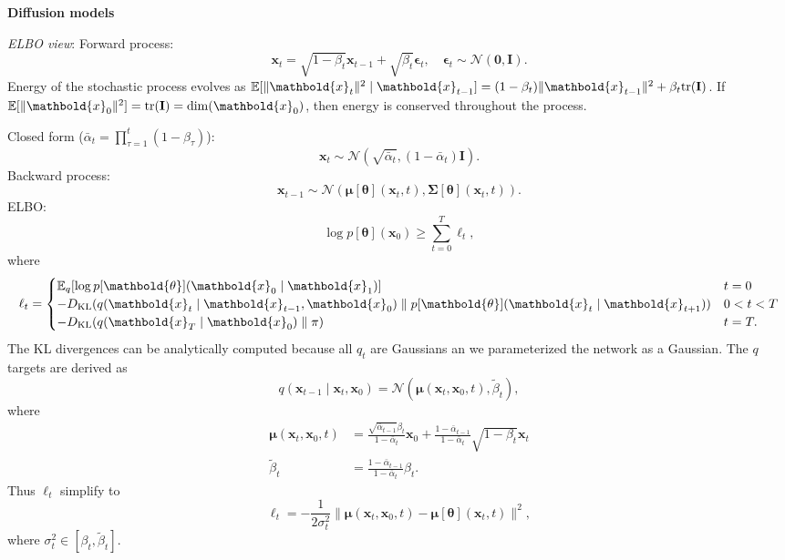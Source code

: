 \documentclass[10pt]{article}
\newenvironment{topic}[1]
{\textbf{\sffamily \footnotesize \colorbox{black}{\rlap{\textbf{\textcolor{white}{#1}}}\hspace{\linewidth}\hspace{-2\fboxsep}}}}
{}
\newenvironment{subtopic}[1]
{\vspace{0.1cm} \begin{center}\textbf{\footnotesize \sffamily #1}\end{center}}
{}
\renewcommand{\mat}[1]{\ensuremath{\mathbf{#1}}}
\renewcommand{\vec}[1]{\ensuremath{\mathbold{#1}}}
\begin{document}
\begin{multicols*}{3}
\begin{topic}{Generative models}
\begin{subtopic}{Diffusion models}
            \textit{ELBO view}: Forward process: \[
                \vec{x}_t = \sqrt{1-\beta_t} \vec{x}_{t-1} + \sqrt{\beta_t} \vec{\epsilon}_t, \quad \vec{\epsilon}_t \sim \mathcal{N}(\vec{0}, \mat{I}).
            \]
            Energy of the stochastic process evolves as $\E[\| \vec{x}_t \|^2 \mid \vec{x}_{t-1}] =
                (1-\beta_t)\| \vec{x}_{t-1} \|^2 + \beta_t \mathrm{tr}(\mat{I})$. If $\E[\| \vec{x}_0 \|^2] =
                \mathrm{tr}(\mat{I}) = \dim(\vec{x}_0)$, then energy is conserved throughout the process.

            Closed form ($\bar{\alpha}_t = \prod_{\tau=1}^t (1-\beta_{\tau})$): \[
                \vec{x}_t \sim \mathcal{N}(\sqrt{\bar{\alpha}_t}, (1-\bar{\alpha}_t) \mat{I}).
            \]
            Backward process: \[
                \vec{x}_{t-1} \sim \mathcal{N}(\vec{\mu}[\vec{\theta}](\vec{x}_t, t), \mat{\Sigma}[\vec{\theta}](\vec{x}_t, t)).
            \]
            ELBO: \[
                \log p[\vec{\theta}](\vec{x}_0) \geq \sum_{t=0}^{T} \ell_t,
            \]
            where \[
                \ell_t = \begin{cases}
                    \E_q[\log p[\vec{\theta}](\vec{x}_0 \mid \vec{x}_1)]                                                          & t = 0     \\
                    -D_{\mathrm{KL}}(q(\vec{x}_t \mid \vec{x}_{t-1}, \vec{x}_0) \;\|\; p[\vec{\theta}](\vec{x}_t \mid \vec{x}_{t+1})) & 0 < t < T \\
                    -D_{\mathrm{KL}}(q(\vec{x}_T \mid \vec{x}_0) \;\|\; \pi)                                                          & t = T.
                \end{cases}
            \]
            The KL divergences can be analytically computed because all $q_t$ are Gaussians an we parameterized
            the network as a Gaussian. The $q$ targets are derived as \[
                q(\vec{x}_{t-1} \mid \vec{x}_t, \vec{x}_0) = \mathcal{N}(\vec{\mu}(\vec{x}_t, \vec{x}_0, t), \tilde{\beta}_t),
            \]
            where
            \begin{align*}
                \vec{\mu}(\vec{x}_t, \vec{x}_0, t) & = \frac{\sqrt{\bar{\alpha}_{t-1}} \beta_t}{1-\bar{\alpha}_t} \vec{x}_0 + \frac{1-\bar{\alpha}_{t-1}}{1-\bar{\alpha}_t} \sqrt{1-\beta_t} \vec{x}_t \\
                \tilde{\beta}_t                    & = \frac{1-\bar{\alpha}_{t-1}}{1-\bar{\alpha}_t} \beta_t.
            \end{align*}
            Thus $\ell_t$ simplify to \[
                \ell_t = -\frac{1}{2 \sigma_t^2} \| \vec{\mu}(\vec{x}_t, \vec{x}_0, t) - \vec{\mu}[\vec{\theta}](\vec{x}_t,t) \|^2,
            \]
            where $\sigma_t^2 \in [\beta_t, \tilde{\beta}_t]$.


\end{subtopic}
\end{topic}
\end{multicols*}
\end{document}
